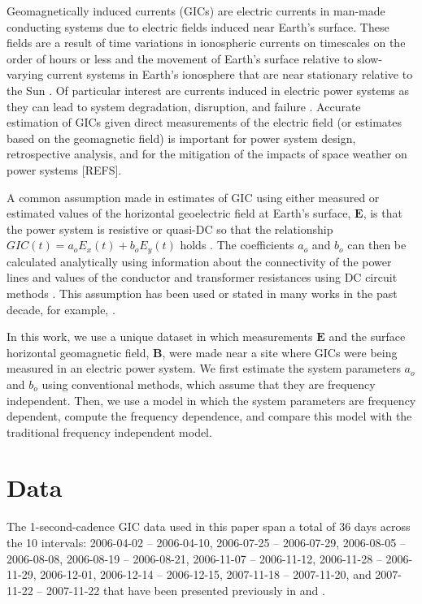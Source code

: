 \documentclass[draft,linenumbers]{agujournal2018}
\begin{document}
Geomagnetically induced currents (GICs) are electric currents in man-made conducting systems due to electric fields induced near Earth's surface. These fields are a result of time variations in ionospheric currents on timescales on the order of hours or less \citep{Ohtani2000} and the movement of Earth's surface relative to slow-varying current systems in Earth's ionosphere that are near stationary relative to the Sun \citep{Stening2013}. Of particular interest are currents induced in electric power systems as they can lead to system degradation, disruption, and failure \citep{Albertson1993,NERC2012}. Accurate estimation of GICs given direct measurements of the electric field (or estimates based on the geomagnetic field) is important for power system design, retrospective analysis, and for the mitigation of the impacts of space weather on power systems [REFS].

A common assumption made in estimates of GIC using either measured or estimated values of the horizontal geoelectric field at Earth's surface, $\mathbf{E}$, is that the power system is resistive or quasi-DC so that the relationship $GIC(t) = a_oE_x(t) + b_oE_y(t)$ holds \citep{Albertson1981,Lehtinen1985}.  The coefficients $a_o$ and $b_o$ can then be calculated analytically using information about the connectivity of the power lines and values of the conductor and transformer resistances using DC circuit methods \citep[e.g.][]{Boteler2014a,Boteler2014b}. This assumption has been used or stated in many works in the past decade, for example, \citet{Pulkkinen2007,Wik2008,Pulkkinen2010,Ngwira2011,Viljanen2012,Overbye2012}.

In this work, we use a unique dataset in which measurements $\mathbf{E}$ and the surface horizontal geomagnetic field, $\mathbf{B}$, were made near a site where GICs were being measured in an electric power system.  We first estimate the system parameters $a_o$ and $b_o$ using conventional methods, which assume that they are frequency independent.  Then, we use a model in which the system parameters are frequency dependent, compute the frequency dependence, and compare this model with the traditional frequency independent model. 

\section{Data}

The 1-second-cadence GIC data used in this paper span a total of 36 days across the 10 intervals: 2006-04-02 -- 2006-04-10, 2006-07-25 -- 2006-07-29, 2006-08-05 -- 2006-08-08, 2006-08-19 -- 2006-08-21, 2006-11-07 -- 2006-11-12, 2006-11-28 -- 2006-11-29, 2006-12-01, 2006-12-14 -- 2006-12-15, 2007-11-18 -- 2007-11-20, and 2007-11-22 -- 2007-11-22 that have been presented previously in \citet{Watari2009} and \cite{Watari2015}.
\end{document}
